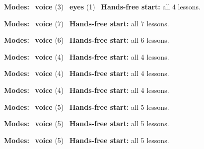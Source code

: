 \expandafter\def\csname hlchaptermodality39\endcsname{%
  {\small\noindent
    \textbf{Modes:} \hlvoicesign{}~\textbf{voice} (3) \quad \hlsightsign{}~\textbf{eyes} (1)\quad
    \hlvoicesign{}~\textbf{Hands-free start:} all 4 lessons.%
    \par}\medskip
}

\expandafter\def\csname hlchaptermodality40\endcsname{%
  {\small\noindent
    \textbf{Modes:} \hlvoicesign{}~\textbf{voice} (7)\quad
    \hlvoicesign{}~\textbf{Hands-free start:} all 7 lessons.%
    \par}\medskip
}

\expandafter\def\csname hlchaptermodality41\endcsname{%
  {\small\noindent
    \textbf{Modes:} \hlvoicesign{}~\textbf{voice} (6)\quad
    \hlvoicesign{}~\textbf{Hands-free start:} all 6 lessons.%
    \par}\medskip
}

\expandafter\def\csname hlchaptermodality42\endcsname{%
  {\small\noindent
    \textbf{Modes:} \hlvoicesign{}~\textbf{voice} (4)\quad
    \hlvoicesign{}~\textbf{Hands-free start:} all 4 lessons.%
    \par}\medskip
}

\expandafter\def\csname hlchaptermodality43\endcsname{%
  {\small\noindent
    \textbf{Modes:} \hlvoicesign{}~\textbf{voice} (4)\quad
    \hlvoicesign{}~\textbf{Hands-free start:} all 4 lessons.%
    \par}\medskip
}

\expandafter\def\csname hlchaptermodality44\endcsname{%
  {\small\noindent
    \textbf{Modes:} \hlvoicesign{}~\textbf{voice} (4)\quad
    \hlvoicesign{}~\textbf{Hands-free start:} all 4 lessons.%
    \par}\medskip
}

\expandafter\def\csname hlchaptermodality45\endcsname{%
  {\small\noindent
    \textbf{Modes:} \hlvoicesign{}~\textbf{voice} (5)\quad
    \hlvoicesign{}~\textbf{Hands-free start:} all 5 lessons.%
    \par}\medskip
}

\expandafter\def\csname hlchaptermodality46\endcsname{%
  {\small\noindent
    \textbf{Modes:} \hlvoicesign{}~\textbf{voice} (5)\quad
    \hlvoicesign{}~\textbf{Hands-free start:} all 5 lessons.%
    \par}\medskip
}

\expandafter\def\csname hlchaptermodality47\endcsname{%
  {\small\noindent
    \textbf{Modes:} \hlvoicesign{}~\textbf{voice} (5)\quad
    \hlvoicesign{}~\textbf{Hands-free start:} all 5 lessons.%
    \par}\medskip
}

